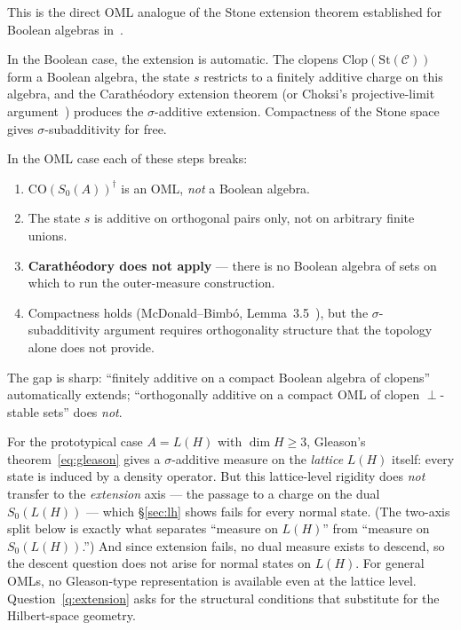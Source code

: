 \documentclass[11pt]{article}
\theoremstyle{definition}
\newcommand{\Ccal}{\mathcal{C}}
\newcommand{\St}{\mathrm{St}}
\newcommand{\Clop}{\mathrm{Clop}}
\newcommand{\CO}{\mathrm{CO}}
\begin{document}
This is the direct OML analogue of the Stone extension theorem
established for Boolean algebras in~\cite{mahon2025}.

In the Boolean case, the extension is automatic.  The clopens
$\Clop(\St(\Ccal))$ form a Boolean algebra, the state $s$
restricts to a finitely additive charge on this algebra, and the
Carath\'{e}odory extension theorem (or Choksi's projective-limit
argument~\cite{choksi1958}) produces the $\sigma$-additive
extension.  Compactness of the Stone space gives
$\sigma$-subadditivity for free.

In the OML case each of these steps breaks:
\begin{enumerate}[label=(\roman*)]
  \item $\CO(S_0(A))^\dagger$ is an OML, \emph{not} a Boolean
    algebra.
  \item The state $s$ is additive on orthogonal pairs only, not on
    arbitrary finite unions.
  \item \textbf{Carath\'{e}odory does not apply} --- there is no
    Boolean algebra of sets on which to run the outer-measure
    construction.
  \item Compactness holds (McDonald--Bimb\'{o},
    Lemma~3.5~\cite{McDonaldBimbo2023}), but the
    $\sigma$-subadditivity argument requires orthogonality
    structure that the topology alone does not provide.
\end{enumerate}
The gap is sharp: ``finitely additive on a compact Boolean algebra
of clopens'' automatically extends; ``orthogonally additive on a
compact OML of clopen $\perp$-stable sets'' does \emph{not}.

For the prototypical case $A = L(H)$ with $\dim H \geq 3$,
Gleason's theorem~\eqref{eq:gleason} gives a $\sigma$-additive measure
on the \emph{lattice} $L(H)$ itself: every state is induced by a
density operator.  But this lattice-level rigidity does \emph{not}
transfer to the \emph{extension} axis --- the passage to a charge on
the dual $S_0(L(H))$ --- which \S\ref{sec:lh} shows fails for every
normal state.  (The two-axis split below is exactly what separates
``measure on $L(H)$'' from ``measure on $S_0(L(H))$.'')  And since
extension fails, no dual measure exists to descend, so the descent
question does not arise for normal states on $L(H)$.  For general OMLs,
no Gleason-type representation is available even at the lattice level.
Question~\ref{q:extension} asks for the structural conditions that
substitute for the Hilbert-space geometry.
\end{document}
